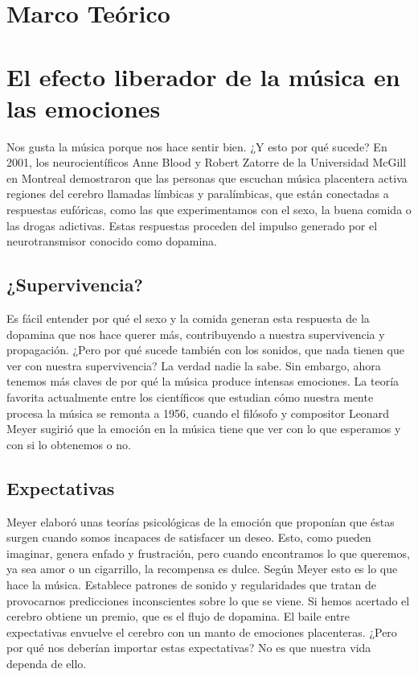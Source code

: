 \documentclass{bmcart}
\begin{document}
\section*{Marco Teórico}
\section*{El efecto liberador de la música en las emociones}
Nos gusta la música porque nos hace sentir bien. ¿Y esto por qué sucede?
En 2001, los neurocientíficos Anne Blood y Robert Zatorre de la Universidad McGill en Montreal demostraron que las personas que escuchan música placentera activa regiones del cerebro llamadas límbicas y paralímbicas, que están conectadas a respuestas eufóricas, como las que experimentamos con el sexo, la buena comida o las drogas adictivas.
Estas respuestas proceden del impulso generado por el neurotransmisor conocido como dopamina.
\subsection*{¿Supervivencia?}
Es fácil entender por qué el sexo y la comida generan esta respuesta de la dopamina que nos hace querer más, contribuyendo a nuestra supervivencia y propagación.
¿Pero por qué sucede también con los sonidos, que nada tienen que ver con nuestra supervivencia?
La verdad nadie la sabe. Sin embargo, ahora tenemos más claves de por qué la música produce intensas emociones.
La teoría favorita actualmente entre los científicos que estudian cómo nuestra mente procesa la música se remonta a 1956, cuando el filósofo y compositor Leonard Meyer sugirió que la emoción en la música tiene que ver con lo que esperamos y con si lo obtenemos o no.
\subsection*{Expectativas}
Meyer elaboró unas teorías psicológicas de la emoción que proponían que éstas surgen cuando somos incapaces de satisfacer un deseo.
Esto, como pueden imaginar, genera enfado y frustración, pero cuando encontramos lo que queremos, ya sea amor o un cigarrillo, la recompensa es dulce.
Según Meyer esto es lo que hace la música. Establece patrones de sonido y regularidades que tratan de provocarnos predicciones inconscientes sobre lo que se viene.
Si hemos acertado el cerebro obtiene un premio, que es el flujo de dopamina.
El baile entre expectativas envuelve el cerebro con un manto de emociones placenteras.
¿Pero por qué nos deberían importar estas expectativas? No es que nuestra vida dependa de ello.
\end{document}
